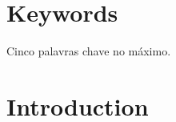 \documentclass[twoside, 11pt]{article}
\begin{document}
\section*{Keywords}

Cinco palavras chave no máximo.

\clearpage            %
\null                %
\newpage             %

\printglossary[type=\acronymtype,nonumberlist, title=List of Abbreviations]

\clearpage            %
\null                %
\newpage             %

\renewcommand{\contentsname}{General Index}
\tableofcontents

\clearpage            %
\null                %
\newpage             %

\renewcommand{\listfigurename}{Figure Index}
\listoffigures

\clearpage            %
\null                %
\newpage             %

\renewcommand{\listtablename}{Table Index}
\listoftables

\clearpage            %
\null                %
\newpage             %

\mainmatter

\section{Introduction}
\end{document}
